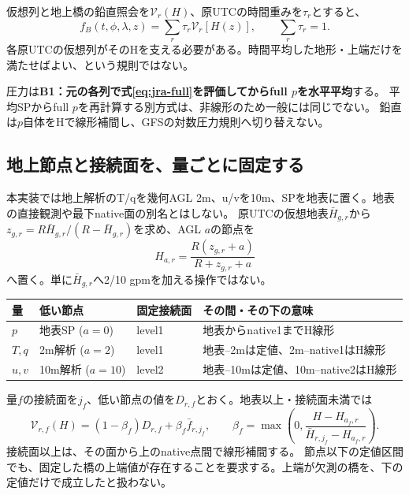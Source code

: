 \documentclass[11pt,a4paper]{article}
\begin{document}
仮想列と地上橋の鉛直照会を$\mathcal V_r(H)$、原UTCの時間重みを$\tau_r$とすると、
\begin{equation}
 f_B(t,\phi,\lambda,z)=\sum_r\tau_r\mathcal V_r[H(z)],\qquad \sum_r\tau_r=1.
 \label{eq:jra-b-time}
\end{equation}
各原UTCの仮想列がそのHを支える必要がある。時間平均した地形・上端だけを満たせばよい、という規則ではない。

圧力は\textbf{B1：元の各列で式\eqref{eq:jra-full}を評価してからfull $p$を水平平均}する。
平均SPからfull $p$を再計算する別方式は、非線形のため一般には同じでない。
鉛直は$p$自体をHで線形補間し、GFSの対数圧力規則へ切り替えない。

\clearpage
\subsection{地上節点と接続面を、量ごとに固定する}\label{th:jra-b-bridge}
本実装では地上解析のT/qを幾何AGL 2m、u/vを10m、SPを地表に置く。地表の直接観測や最下native面の別名とはしない。
原UTCの仮想地表$\bar H_{g,r}$から$z_{g,r}=R\bar H_{g,r}/(R-\bar H_{g,r})$を求め、AGL $a$の節点を
\begin{equation}
 H_{a,r}=\frac{R(z_{g,r}+a)}{R+z_{g,r}+a}
 \label{eq:jra-anchor}
\end{equation}
へ置く。単に$\bar H_{g,r}$へ2/10 gpmを加える操作ではない。

\begin{center}\small
\begin{tabular}{@{}p{19mm}p{31mm}p{28mm}p{69mm}@{}}
\toprule 量 & 低い節点 & 固定接続面 & その間・その下の意味 \\\midrule
$p$ & 地表SP ($a=0$) & level1 & 地表からnative1までH線形 \\
$T,q$ & 2m解析 ($a=2$) & level1 & 地表--2mは定値、2m--native1はH線形 \\
$u,v$ & 10m解析 ($a=10$) & level2 & 地表--10mは定値、10m--native2はH線形 \\\bottomrule
\end{tabular}
\end{center}
量$f$の接続面を$j_f$、低い節点の値を$D_{r,f}$とおく。地表以上・接続面未満では
\begin{equation}
 \mathcal V_{r,f}(H)=(1-\beta_f)D_{r,f}+\beta_f\bar f_{r,j_f},\qquad
 \beta_f=\max\!\left(0,\frac{H-H_{a_f,r}}{\bar H_{r,j_f}-H_{a_f,r}}\right).
 \label{eq:jra-bridge}
\end{equation}
接続面以上は、その面から上のnative点間で線形補間する。
節点以下の定値区間でも、固定した橋の上端値が存在することを要求する。上端が欠測の橋を、下の定値だけで成立したと扱わない。
\end{document}
